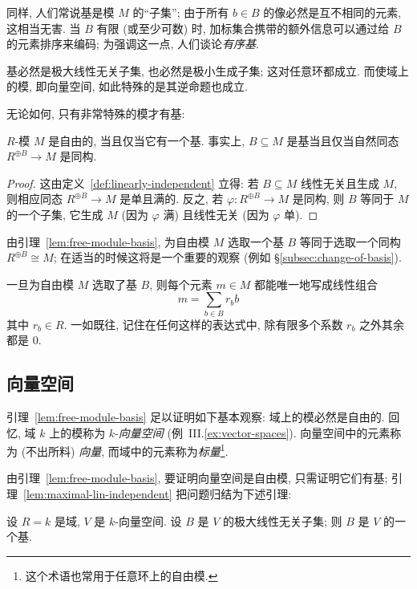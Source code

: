同样, 人们常说基是模 $M$ 的``子集''; 由于所有 $b\in B$ 的像必然是互不相同的元素, 这相当无害. 当 $B$ 有限 (或至少可数) 时, 加标集合携带的额外信息可以通过给 $B$ 的元素排序来编码; 为强调这一点, 人们谈论\emph{有序基}.

基必然是极大线性无关子集, 也必然是极小生成子集; 这对任意环都成立. 而使域上的模, 即向量空间, 如此特殊的是其逆命题也成立.

无论如何, 只有非常特殊的模才有基:

\begin{lemma}\label{lem:free-module-basis}
$R$-模 $M$ 是自由的, 当且仅当它有一个基. 事实上, $B\subseteq M$ 是基当且仅当自然同态 $R^{\oplus B}\to M$ 是同构.
\end{lemma}

\begin{proof}
这由定义~\ref{def:linearly-independent} 立得: 若 $B\subseteq M$ 线性无关且生成 $M$, 则相应同态 $R^{\oplus B}\to M$ 是单且满的. 反之, 若 $\varphi:R^{\oplus B}\to M$ 是同构, 则 $B$ 等同于 $M$ 的一个子集, 它生成 $M$ (因为 $\varphi$ 满) 且线性无关 (因为 $\varphi$ 单).
\end{proof}

由引理~\ref{lem:free-module-basis}, 为自由模 $M$ 选取一个基 $B$ 等同于选取一个同构 $R^{\oplus B}\cong M$; 在适当的时候这将是一个重要的观察 (例如 §\ref{subsec:change-of-basis}).

一旦为自由模 $M$ 选取了基 $B$, 则每个元素 $m\in M$ 都能唯一地写成线性组合
\[
m = \sum_{b\in B} r_b b
\]
其中 $r_b\in R$. 一如既往, 记住在任何这样的表达式中, 除有限多个系数 $r_b$ 之外其余都是 $0$.

\subsection{向量空间}\label{subsec:vector-spaces}

引理~\ref{lem:free-module-basis} 足以证明如下基本观察: 域上的模必然是自由的. 回忆, 域 $k$ 上的模称为 $k$-\emph{向量空间} (例~III.\ref{ex:vector-spaces}). 向量空间中的元素称为 (不出所料) \emph{向量}, 而域中的元素称为\emph{标量}\footnote{这个术语也常用于任意环上的自由模.}.

由引理~\ref{lem:free-module-basis}, 要证明向量空间是自由模, 只需证明它们有基; 引理~\ref{lem:maximal-lin-independent} 把问题归结为下述引理:

\begin{lemma}\label{lem:maximal-is-basis}
设 $R=k$ 是域, $V$ 是 $k$-向量空间. 设 $B$ 是 $V$ 的极大线性无关子集; 则 $B$ 是 $V$ 的一个基.
\end{lemma}

